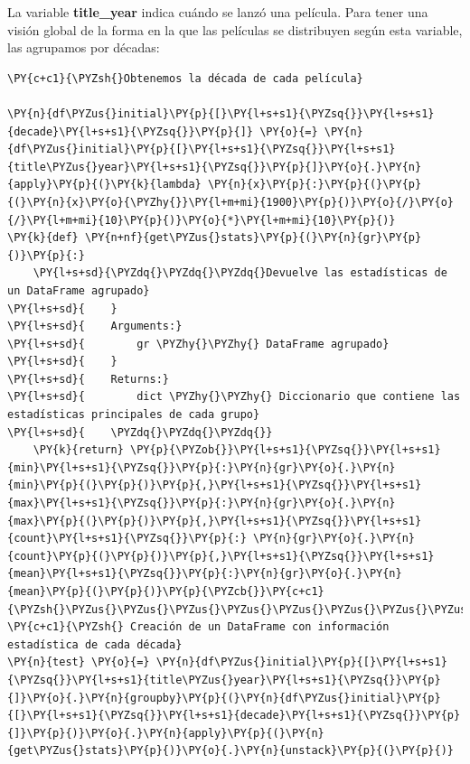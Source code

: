     La variable \textbf{title\_year} indica cuándo se lanzó una película.
Para tener una visión global de la forma en la que las películas se
distribuyen según esta variable, las agrupamos por décadas:

    \begin{tcolorbox}[breakable, size=fbox, boxrule=1pt, pad at break*=1mm,colback=cellbackground, colframe=cellborder]
\begin{Verbatim}[commandchars=\\\{\}]
\PY{c+c1}{\PYZsh{}Obtenemos la década de cada película}

\PY{n}{df\PYZus{}initial}\PY{p}{[}\PY{l+s+s1}{\PYZsq{}}\PY{l+s+s1}{decade}\PY{l+s+s1}{\PYZsq{}}\PY{p}{]} \PY{o}{=} \PY{n}{df\PYZus{}initial}\PY{p}{[}\PY{l+s+s1}{\PYZsq{}}\PY{l+s+s1}{title\PYZus{}year}\PY{l+s+s1}{\PYZsq{}}\PY{p}{]}\PY{o}{.}\PY{n}{apply}\PY{p}{(}\PY{k}{lambda} \PY{n}{x}\PY{p}{:}\PY{p}{(}\PY{p}{(}\PY{n}{x}\PY{o}{\PYZhy{}}\PY{l+m+mi}{1900}\PY{p}{)}\PY{o}{/}\PY{o}{/}\PY{l+m+mi}{10}\PY{p}{)}\PY{o}{*}\PY{l+m+mi}{10}\PY{p}{)}
\PY{k}{def} \PY{n+nf}{get\PYZus{}stats}\PY{p}{(}\PY{n}{gr}\PY{p}{)}\PY{p}{:}
    \PY{l+s+sd}{\PYZdq{}\PYZdq{}\PYZdq{}Devuelve las estadísticas de un DataFrame agrupado}
\PY{l+s+sd}{    }
\PY{l+s+sd}{    Arguments:}
\PY{l+s+sd}{        gr \PYZhy{}\PYZhy{} DataFrame agrupado}
\PY{l+s+sd}{    }
\PY{l+s+sd}{    Returns:}
\PY{l+s+sd}{        dict \PYZhy{}\PYZhy{} Diccionario que contiene las estadísticas principales de cada grupo}
\PY{l+s+sd}{    \PYZdq{}\PYZdq{}\PYZdq{}}
    \PY{k}{return} \PY{p}{\PYZob{}}\PY{l+s+s1}{\PYZsq{}}\PY{l+s+s1}{min}\PY{l+s+s1}{\PYZsq{}}\PY{p}{:}\PY{n}{gr}\PY{o}{.}\PY{n}{min}\PY{p}{(}\PY{p}{)}\PY{p}{,}\PY{l+s+s1}{\PYZsq{}}\PY{l+s+s1}{max}\PY{l+s+s1}{\PYZsq{}}\PY{p}{:}\PY{n}{gr}\PY{o}{.}\PY{n}{max}\PY{p}{(}\PY{p}{)}\PY{p}{,}\PY{l+s+s1}{\PYZsq{}}\PY{l+s+s1}{count}\PY{l+s+s1}{\PYZsq{}}\PY{p}{:} \PY{n}{gr}\PY{o}{.}\PY{n}{count}\PY{p}{(}\PY{p}{)}\PY{p}{,}\PY{l+s+s1}{\PYZsq{}}\PY{l+s+s1}{mean}\PY{l+s+s1}{\PYZsq{}}\PY{p}{:}\PY{n}{gr}\PY{o}{.}\PY{n}{mean}\PY{p}{(}\PY{p}{)}\PY{p}{\PYZcb{}}\PY{c+c1}{\PYZsh{}\PYZus{}\PYZus{}\PYZus{}\PYZus{}\PYZus{}\PYZus{}\PYZus{}\PYZus{}\PYZus{}\PYZus{}\PYZus{}\PYZus{}\PYZus{}\PYZus{}\PYZus{}\PYZus{}\PYZus{}\PYZus{}\PYZus{}\PYZus{}\PYZus{}\PYZus{}\PYZus{}\PYZus{}\PYZus{}\PYZus{}\PYZus{}\PYZus{}\PYZus{}\PYZus{}\PYZus{}\PYZus{}\PYZus{}\PYZus{}\PYZus{}\PYZus{}\PYZus{}\PYZus{}\PYZus{}\PYZus{}\PYZus{}\PYZus{}\PYZus{}\PYZus{}\PYZus{}\PYZus{}\PYZus{}\PYZus{}\PYZus{}\PYZus{}\PYZus{}\PYZus{}\PYZus{}\PYZus{}\PYZus{}\PYZus{}\PYZus{}\PYZus{}\PYZus{}\PYZus{}\PYZus{}\PYZus{}}
\PY{c+c1}{\PYZsh{} Creación de un DataFrame con información estadística de cada década}
\PY{n}{test} \PY{o}{=} \PY{n}{df\PYZus{}initial}\PY{p}{[}\PY{l+s+s1}{\PYZsq{}}\PY{l+s+s1}{title\PYZus{}year}\PY{l+s+s1}{\PYZsq{}}\PY{p}{]}\PY{o}{.}\PY{n}{groupby}\PY{p}{(}\PY{n}{df\PYZus{}initial}\PY{p}{[}\PY{l+s+s1}{\PYZsq{}}\PY{l+s+s1}{decade}\PY{l+s+s1}{\PYZsq{}}\PY{p}{]}\PY{p}{)}\PY{o}{.}\PY{n}{apply}\PY{p}{(}\PY{n}{get\PYZus{}stats}\PY{p}{)}\PY{o}{.}\PY{n}{unstack}\PY{p}{(}\PY{p}{)}
\end{Verbatim}
\end{tcolorbox}

